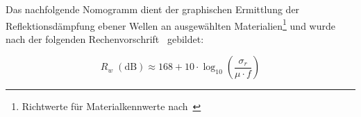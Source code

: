 
Das nachfolgende Nomogramm dient der graphischen Ermittlung der Reflektionsdämpfung ebener Wellen an ausgewählten Materialien\footnote{Richtwerte für Materialkennwerte nach~\cite{Simplified_shielding}} und wurde nach der folgenden Rechenvorschrift~\cite{Simplified_shielding} gebildet:

\begin{equation}
    R_w \; \left(\text{dB}\right) \approx 168 + 10 \cdot \log_{10}\left(\frac{\sigma_r}{\mu \cdot f}\right)
\end{equation}